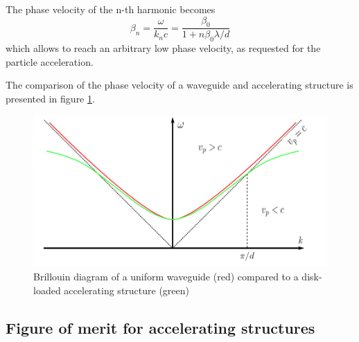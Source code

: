 The phase velocity of the n-th harmonic becomes
\begin{equation}
\beta_n = \frac{\omega}{k_n c} = \frac{\beta_0}{1+n\beta_0 \lambda/d}
\end{equation}
which allows to reach an arbitrary low phase velocity, as requested for the particle acceleration.

The comparison of the phase velocity of a waveguide and accelerating structure is presented in figure \ref{vp_fig}.



\begin{figure}[h]
\centering

\includegraphics[scale=0.4]{pictures/vp}
\caption{Brillouin diagram of a uniform waveguide (red) compared to a disk-loaded accelerating structure (green) \cite{Kovermann:1330346}}
\label{vp_fig}

\end{figure}


\subsection[Figure of merit for accelerating structures]{Figure of merit for accelerating structures}

